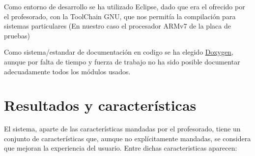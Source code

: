 \documentclass[12pt,letterpaper]{article}
\begin{document}
Como entorno de desarrollo se ha utilizado Eclipse, dado que era el
ofrecido por el profesorado, con la ToolChain GNU, que nos permitía la
compilación para sistemas particulares (En nuestro caso el procesador
ARMv7 de la placa de pruebas)

Como sistema/estandar de documentación en codigo se ha elegido
\href{http://www.stack.nl/~dimitri/doxygen/}{Doxygen}, aunque por
falta de tiempo y fuerza de trabajo no ha sido posible documentar
adecuadamente todos los módulos usados.
\section{Resultados y características}
\label{subsec:resultados-caracteristicas}
El sistema, aparte de las características mandadas por el profesorado,
tiene un conjunto de características que, aunque no explícitamente
mandadas, se considera que mejoran la experiencia del usuario. Entre
dichas caracteristicas aparecen:
\end{document}
